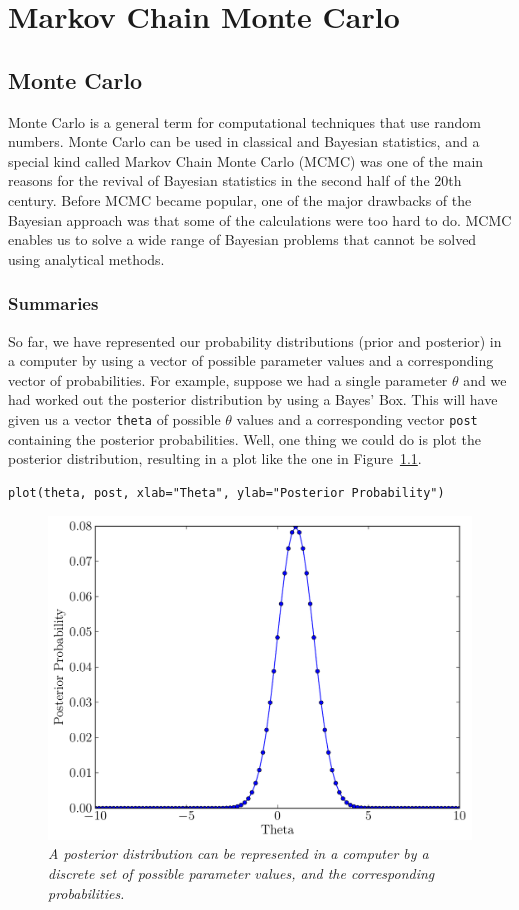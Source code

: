 \chapter{Markov Chain Monte Carlo}
\section{Monte Carlo}
Monte Carlo is a general term for computational techniques that use random
numbers.
Monte Carlo can be used in classical and Bayesian statistics, and a special kind
called Markov Chain Monte Carlo (MCMC) was one of the main reasons
for the revival of Bayesian statistics in the second half of the 20th century.
Before MCMC became popular, one of the major drawbacks of the Bayesian approach
was that some of the calculations were too hard to do. MCMC enables us to solve
a wide range of Bayesian problems that cannot be solved using analytical
methods.

\subsection{Summaries}
So far, we have represented our probability distributions (prior and posterior)
in a computer by using a vector of possible parameter values and a corresponding
vector of probabilities. For example, suppose we had a single parameter $\theta$
and we had worked out the posterior distribution by using a Bayes' Box. This
will have given us a vector {\tt theta} of possible $\theta$ values and a corresponding
vector {\tt post} containing the posterior probabilities. Well, one thing we could
do is plot the posterior distribution, resulting in a plot like the one in
Figure~\ref{fig:normal}.
\begin{verbatim}
plot(theta, post, xlab="Theta", ylab="Posterior Probability")
\end{verbatim}

\begin{figure}[ht!]
\begin{center}
\includegraphics[scale=0.5]{Figures/normal.pdf}
\caption{\it A posterior distribution can be represented in a computer by a discrete
set of possible parameter values, and the corresponding probabilities.\label{fig:normal}}
\end{center}
\end{figure}

